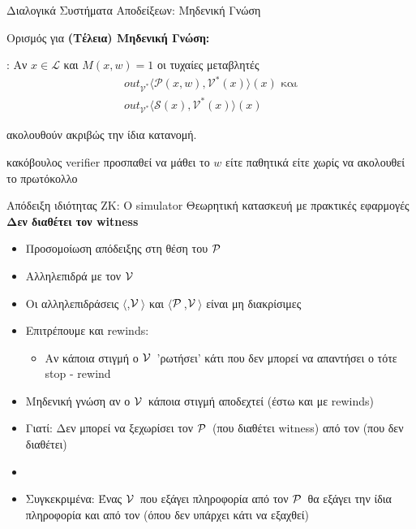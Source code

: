 \documentclass[10pt,handout]{beamer}
\begin{document}
\begin{frame}{Διαλογικά Συστήματα Αποδείξεων: Μηδενική Γνώση}

\begin{block}{Ορισμός για \textbf{(Τέλεια) Μηδενική Γνώση:}}
 
 : 
\pause
Αν  $x \in \mathcal{L}$ και $M(x,w) = 1$ οι τυχαίες μεταβλητές 
\pause
\begin{align*}
  out_{\mathcal{V}^*}\langle \mathcal{P}(x,w), \mathcal{V}^*(x) \rangle (x)  \, \, \text{και} \\
  out_{\mathcal{V}^*}\langle \mathcal{S}(x), \mathcal{V}^*(x) \rangle(x)   
\end{align*}

ακολουθούν ακριβώς την ίδια κατανομή.
\end{block}

\alert{κακόβουλος verifier}  προσπαθεί να μάθει το $w$ είτε παθητικά είτε χωρίς να ακολουθεί το πρωτόκολλο
\end{frame}

\begin{frame}{Απόδειξη ιδιότητας ΖΚ: Ο simulator}
{Θεωρητική κατασκευή με πρακτικές εφαρμογές}
\textbf{Δεν διαθέτει τον witness}
\pause
\begin{small}
\begin{itemize}
\setlength\itemsep{0.01em}
\item Προσομοίωση απόδειξης στη θέση του $\mathcal{P}\,$ 
\item Αλληλεπιδρά με τον $\mathcal{V}\,$
\pause
\item Οι αλληλεπιδράσεις $\langle$\siml,$\mathcal{V}\,$$\rangle$ και $\langle$$\mathcal{P}\,$,$\mathcal{V}\,$$\rangle$ είναι μη διακρίσιμες
\pause
\item Επιτρέπουμε και rewinds:
\pause
\begin{itemize}
\item Αν κάποια στιγμή ο $\mathcal{V}\,$ 'ρωτήσει' κάτι που δεν μπορεί να απαντήσει ο \siml τότε stop - rewind
\end{itemize}
\pause
\item Μηδενική γνώση αν ο $\mathcal{V}\,$ κάποια στιγμή αποδεχτεί (έστω και με rewinds)
\pause
\item Γιατί: \pause
Δεν μπορεί να ξεχωρίσει τον $\mathcal{P}\,$ (που διαθέτει witness) από τον \siml (που δεν διαθέτει) 
\pause
\item {}
\pause
\item Συγκεκριμένα: Ένας $\mathcal{V}\,$ που εξάγει πληροφορία από τον $\mathcal{P}\,$ θα εξάγει την ίδια πληροφορία και από τον \siml (όπου δεν υπάρχει κάτι να εξαχθεί)

\end{itemize}
\end{small}
\end{frame}
\end{document}
